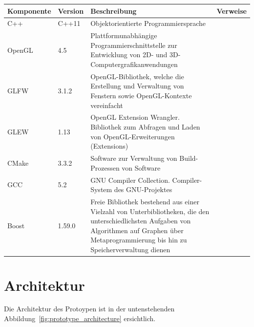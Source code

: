 \begin{tabular}{llp{10cm}l}
    \toprule
    \textbf{Komponente} & \textbf{Version} & \textbf{Beschreibung} & \textbf{Verweise} \\
    \midrule
    C++        & C++11   & Objektorientierte Programmiersprache &\protect\footnotemark\\
    OpenGL     & 4.5     & Plattformunabhängige Programmierschnittstelle zur Entwicklung von 2D- und 3D-Computergrafikanwendungen~\cite{wikipedia_the_free_encyclopedia_opengl_2015} &\protect\footnotemark\\
    GLFW       & 3.1.2   & OpenGL-Bibliothek, welche die Erstellung und Verwaltung von Fenstern sowie OpenGL-Kontexte vereinfacht~\cite{wikipedia_the_free_encyclopedia_glfw_2015} &\protect\footnotemark\\
    GLEW       & 1.13    & OpenGL Extension Wrangler. Bibliothek zum Abfragen und Laden von OpenGL-Erweiterungen (Extensions)~\cite{wikipedia_the_free_encyclopedia_opengl_2015-1}     &\protect\footnotemark\\
    CMake      & 3.3.2   & Software zur Verwaltung von Build-Prozessen von Software                                               &\protect\footnotemark\\
    GCC        & 5.2     & GNU Compiler Collection. Compiler-System des GNU-Projektes                                             &\protect\footnotemark\\
    Boost      & 1.59.0  & Freie Bibliothek bestehend aus einer Vielzahl von Unterbibliotheken, die den unterschiedlichsten Aufgaben von Algorithmen auf Graphen über Metaprogrammierung bis hin zu Speicherverwaltung dienen~\cite{wikipedia_the_free_encyclopedia_boost_2015} &\protect\footnotemark\\
    \bottomrule
\end{tabular}

\section{Architektur}
\label{sec:architecture}

Die Architektur des Protoypen ist in der untenstehenden
Abbildung~\ref{fig:prototype_architecture} ersichtlich.

